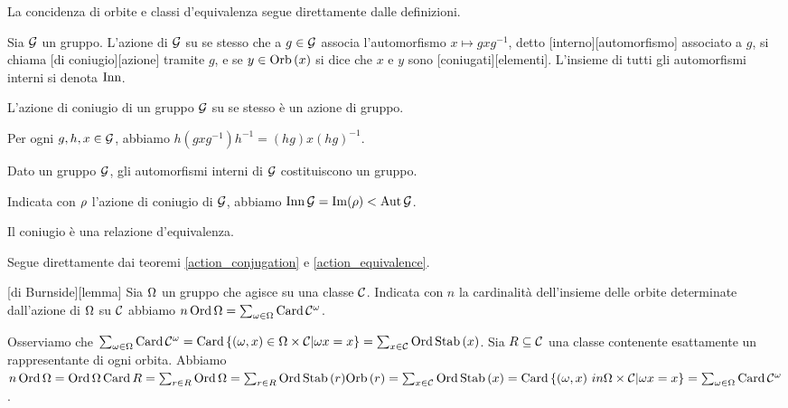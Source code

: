 \par La concidenza di orbite e classi d'equivalenza segue direttamente dalle definizioni. \EndProof
\begin{Definition}
	Sia $\mathcal{G}$ un gruppo. L'azione di $\mathcal{G}$ su se stesso che a $g \in \mathcal{G}$ associa l'automorfismo $x \mapsto gxg^{-1}$, detto [interno][automorfismo] associato a $g$, si chiama [di coniugio][azione] tramite $g$, e se $y \in \Orbit{x}$ si dice che $x$ e $y$ sono [coniugati][elementi]. L'insieme di tutti gli automorfismi interni si denota $\operatorname{Inn}$.
\end{Definition}
\begin{Theorem}\label{action_conjugation}
	L'azione di coniugio di un gruppo $\mathcal{G}$ su se stesso \`e un azione di gruppo.
\end{Theorem}
\Proof Per ogni $g, h, x \in \mathcal{G}$, abbiamo $h(gxg^{-1})h^{-1} = (hg)x(hg)^{-1}$. \EndProof
\begin{Corollary}
	Dato un gruppo $\mathcal{G}$, gli automorfismi interni di $\mathcal{G}$ costituiscono un gruppo.
\end{Corollary}
\Proof Indicata con $\rho$ l'azione di coniugio di $\mathcal{G}$, abbiamo $\operatorname{Inn}{\mathcal{G}} = \operatorname{Im}(\rho) < \operatorname{Aut}{\mathcal{G}}$. \EndProof
\begin{Corollary}
	Il coniugio \`e una relazione d'equivalenza.
\end{Corollary}
\Proof Segue direttamente dai teoremi \ref{action_conjugation} e \ref{action_equivalence}. \EndProof
\begin{Lemma}
	[di Burnside][lemma] Sia $\Omega$ un gruppo che agisce su una classe $\mathcal{C}$. Indicata con $n$ la cardinalit\`a dell'insieme delle orbite determinate dall'azione di $\Omega$ su $\mathcal{C}$ abbiamo $n\operatorname{\operatorname{Ord}}{\Omega} = \sum_{\omega \in \Omega} \operatorname{Card}{\mathcal{C}^{\omega}}$.
\end{Lemma}
\Proof Osserviamo che $\sum_{\Operator \in \Operators} \Cardinality{\Class}^{\Operator} = \Cardinality{\lbrace (\Operator,x) \in \Operators \times \Class | \Operator x = x \rbrace} = \sum_{x \in \Class} \Order{\Stabilizer{x}}$.
\Proof Sia $R \subseteq \mathcal{C}$ una classe contenente esattamente un rappresentante di ogni orbita. Abbiamo $n\GroupOrder{\Operators} = \GroupOrder{\Operators}\Cardinality{R} = \sum_{r \in R} \GroupOrder{\Operators} = \sum_{r \in R} \GroupOrder{\Stabilizer{r}}\Orbit{r} = \sum_{x \in \Class} \GroupOrder{\Stabilizer{x}} = \Cardinality{\lbrace (\Operator,x) \ in \Operators \times \Class | \Operator x = x \rbrace} = \sum_{\Operator \in \Operators} \Cardinality{\Fixed{\Class}{\Operator}}$. \EndProof
